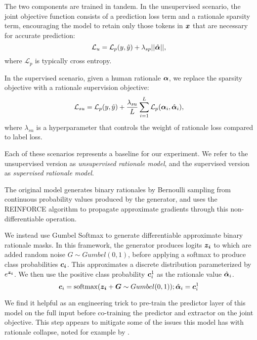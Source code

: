 The two components are trained in tandem. In the unsupervised scenario, the joint objective function consists of a prediction loss term and a rationale sparsity term, encouraging the model to retain only those tokens in $\bm{x}$ that are necessary for accurate prediction:
\begingroup\abovedisplayskip=4pt \belowdisplayskip=4pt
$$\mathcal{L}_u=\mathcal{L}_p(y,\hat{y}) + \lambda_{sp}||\hat{\bm{\alpha}}||,$$
\endgroup
where $\mathcal{L}_p$ is typically cross entropy. 

In the supervised scenario, given a human rationale $\bm{\alpha}$, we replace the sparsity objective with a rationale supervision objective:
\begingroup\abovedisplayskip=4pt \belowdisplayskip=4pt
$$\mathcal{L}_{su}=\mathcal{L}_p(y,\hat{y}) + \frac{\lambda_{su}}{L}\sum_{i=1}^L \mathcal{L}_p(\bm{\alpha}_i, \hat{\bm{\alpha}}_i),$$
\endgroup
where $\lambda_{su}$ is a hyperparameter that controls the weight of rationale loss compared to label loss.


Each of these scenarios represents a baseline for our experiment. 
We refer to the unsupervised version as {\em unsupervised rationale model}, and the supervised version as {\em supervised rationale model}.


The original \citet{lei_rationalizing_2016} model generates binary rationales by 
Bernoulli sampling from continuous probability values produced by the generator, 
and uses the REINFORCE algorithm \citep{williams_simple_1992} to propagate approximate gradients through this non-differentiable operation. 

We instead use Gumbel Softmax \citep{jang_categorical_2017} to generate differentiable approximate binary rationale masks. In this framework,
the generator produces logits $\bm{z_i}$ 
to which are added random noise $G \sim Gumbel(0,1)$, before applying a softmax
to produce 
class probabilities $\bm{c_i}$. This approximates 
a discrete distribution parameterized by $e^{\bm{z_i}}$. We then use the positive class probability $\bm{c}_i^1$ as the rationale value $\hat{\bm{\alpha}}_i$.
\begingroup\abovedisplayskip=4pt \belowdisplayskip=4pt
$$\bm{c}_i = \operatorname{softmax}(\bm{z_i}+\bm{G} \sim Gumbel(0,1)); \hat{\bm{\alpha}}_i = \bm{c}_i^1 $$
\endgroup


We find it helpful as an engineering trick to pre-train the predictor layer of this model on the full input before co-training the predictor and extractor on the joint objective. This step appears to mitigate some of the issues this model has with rationale collapse, noted for example by \citet{deyoung_eraser_2019}. 

